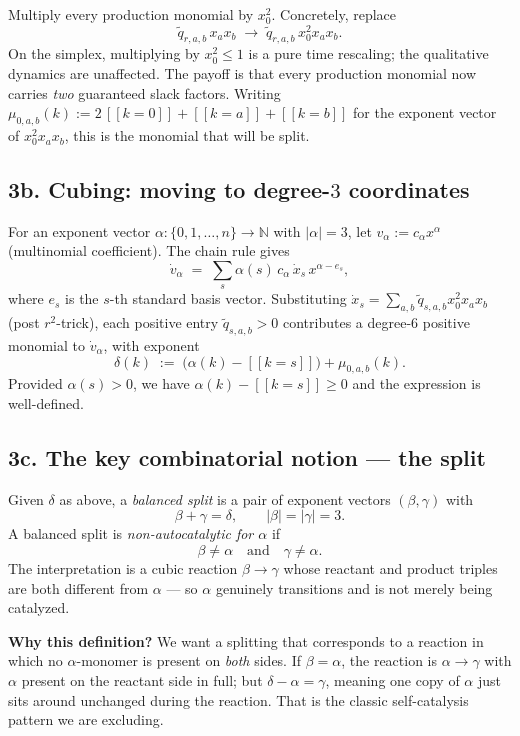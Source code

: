 \documentclass[11pt]{article}
\newcommand{\N}{\mathbb{N}}
\newcommand{\iv}[1]{[\![#1]\!]}
\begin{document}
Multiply every production monomial by $x_0^2$. Concretely, replace
\[
   \widetilde q_{r,a,b}\, x_a x_b
   \;\longrightarrow\;
   \widetilde q_{r,a,b}\, x_0^2 x_a x_b.
\]
On the simplex, multiplying by $x_0^2 \le 1$ is a pure time rescaling;
the qualitative dynamics are unaffected. The payoff is that every
production monomial now carries \emph{two} guaranteed slack factors.
Writing $\mu_{0,a,b}(k) := 2\,\iv{k=0} + \iv{k=a} + \iv{k=b}$ for the
exponent vector of $x_0^2 x_a x_b$, this is the monomial that will be
split.

\subsection*{3b. Cubing: moving to degree-$3$ coordinates}

For an exponent vector $\alpha : \{0,1,\dots,n\} \to \N$ with $|\alpha|=3$,
let $v_\alpha := c_\alpha x^\alpha$ (multinomial coefficient). The
chain rule gives
\[
   \dot v_\alpha \;=\; \sum_s \alpha(s)\, c_\alpha\, \dot x_s\, x^{\alpha - e_s},
\]
where $e_s$ is the $s$-th standard basis vector. Substituting
$\dot x_s = \sum_{a,b} \widetilde q_{s,a,b} x_0^2 x_a x_b$ (post $r^2$-trick),
each positive entry $\widetilde q_{s,a,b} > 0$ contributes a
degree-$6$ positive monomial to $\dot v_\alpha$, with exponent
\begin{equation}
   \delta(k) \;:=\; \bigl(\alpha(k) - \iv{k=s}\bigr) + \mu_{0,a,b}(k).
   \tag{$\delta$}
\end{equation}
Provided $\alpha(s) > 0$, we have $\alpha(k) - \iv{k=s} \ge 0$ and the
expression is well-defined.

\subsection*{3c. The key combinatorial notion --- the split}
\label{sec:per-pair}

Given $\delta$ as above, a \emph{balanced split} is a pair of exponent
vectors $(\beta, \gamma)$ with
\[
   \beta + \gamma = \delta, \qquad |\beta| = |\gamma| = 3.
\]
A balanced split is \emph{non-autocatalytic for $\alpha$} if
\[
   \beta \ne \alpha \quad\text{and}\quad \gamma \ne \alpha.
\]
The interpretation is a cubic reaction $\beta \to \gamma$ whose reactant
and product triples are both different from $\alpha$ --- so $\alpha$
genuinely transitions and is not merely being catalyzed.

\medskip

\textbf{Why this definition?} We want a splitting that corresponds to
a reaction in which no $\alpha$-monomer is present on \emph{both}
sides. If $\beta = \alpha$, the reaction is $\alpha \to \gamma$ with
$\alpha$ present on the reactant side in full; but $\delta - \alpha =
\gamma$, meaning one copy of $\alpha$ just sits around unchanged during
the reaction. That is the classic self-catalysis pattern we are
excluding.
\end{document}
